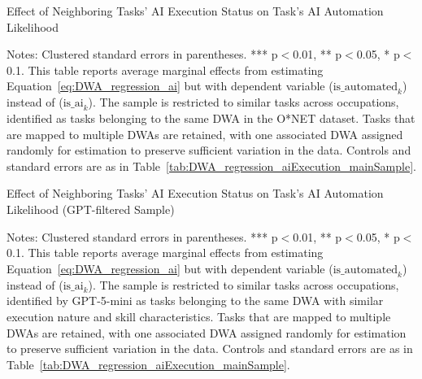 \begin{table}[!t]
\centering
\caption{Effect of Neighboring Tasks' AI Execution Status on Task's AI Automation Likelihood}
\label{tab:DWA_regression_aiAutomation_mainSample}
    \footnotesize
\resizebox{\textwidth}{!}{

}
\begin{minipage}{1\linewidth}
\begin{spacing}{0.2}
{\fontsize{9.5pt}{10pt}\selectfont Notes: Clustered standard errors in parentheses. *** p$<$0.01, ** p$<$0.05, * p$<$0.1.
This table reports average marginal effects from estimating Equation~\eqref{eq:DWA_regression_ai} but with dependent variable ($\text{is\_automated}_{k}$) instead of ($\text{is\_ai}_{k}$).
The sample is restricted to similar tasks across occupations, identified as tasks belonging to the same DWA in the O*NET dataset.
Tasks that are mapped to multiple DWAs are retained, with one associated DWA assigned randomly for estimation to preserve sufficient variation in the data.
Controls and standard errors are as in Table~\ref{tab:DWA_regression_aiExecution_mainSample}.}
\end{spacing}
\end{minipage}\end{table}

\begin{table}[!t]
\centering
\caption{Effect of Neighboring Tasks' AI Execution Status on Task's AI Automation Likelihood (GPT-filtered Sample)}
\label{tab:DWA_regression_aiAutomation_GPTsample}
    \footnotesize
\resizebox{\textwidth}{!}{

}
\begin{minipage}{1\linewidth}
\begin{spacing}{0.2}
{\fontsize{9.5pt}{10pt}\selectfont Notes: Clustered standard errors in parentheses. *** p$<$0.01, ** p$<$0.05, * p$<$0.1.
This table reports average marginal effects from estimating Equation~\eqref{eq:DWA_regression_ai} but with dependent variable ($\text{is\_automated}_{k}$) instead of ($\text{is\_ai}_{k}$).
The sample is restricted to similar tasks across occupations, identified by GPT-5-mini as tasks belonging to the same DWA with similar execution nature and skill characteristics.
Tasks that are mapped to multiple DWAs are retained, with one associated DWA assigned randomly for estimation to preserve sufficient variation in the data.
Controls and standard errors are as in Table~\ref{tab:DWA_regression_aiExecution_mainSample}.}
\end{spacing}
\end{minipage}\end{table}


